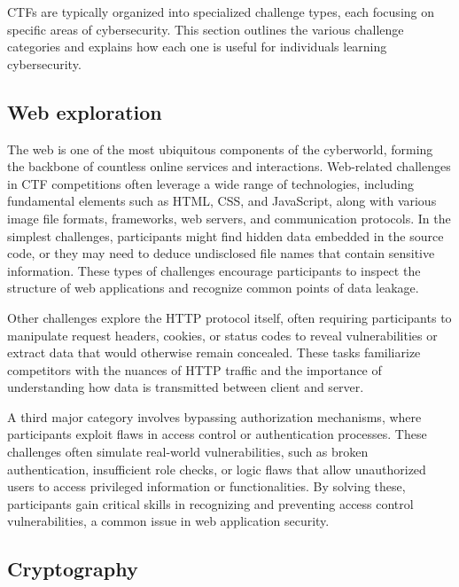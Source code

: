 \documentclass[conference]{IEEEtran}
\begin{document}
CTFs are typically organized into specialized challenge types, each focusing on
specific areas of cybersecurity. This section outlines the various challenge
categories and explains how each one is useful for individuals learning
cybersecurity.

\subsection{Web exploration}

The web is one of the most ubiquitous components of the cyberworld, forming the
backbone of countless online services and interactions. Web-related challenges
in CTF competitions often leverage a wide range of technologies, including
fundamental elements such as HTML, CSS, and JavaScript, along with various
image file formats, frameworks, web servers, and communication protocols. In
the simplest challenges, participants might find hidden data embedded in the
source code, or they may need to deduce undisclosed file names that
contain sensitive information. These types of challenges encourage participants
to inspect the structure of web applications and recognize common points of
data leakage.

Other challenges explore the HTTP protocol itself, often requiring participants
to manipulate request headers, cookies, or status codes to reveal
vulnerabilities or extract data that would otherwise remain concealed. These
tasks familiarize competitors with the nuances of HTTP traffic and the
importance of understanding how data is transmitted between client and server.

A third major category involves bypassing authorization mechanisms, where
participants exploit flaws in access control or authentication processes. These
challenges often simulate real-world vulnerabilities, such as broken
authentication, insufficient role checks, or logic flaws that allow
unauthorized users to access privileged information or functionalities. By
solving these, participants gain critical skills in recognizing and preventing
access control vulnerabilities, a common issue in web application security.

\subsection{Cryptography}

\cite{morkel2005}

\cite{luciano1987}
\end{document}
